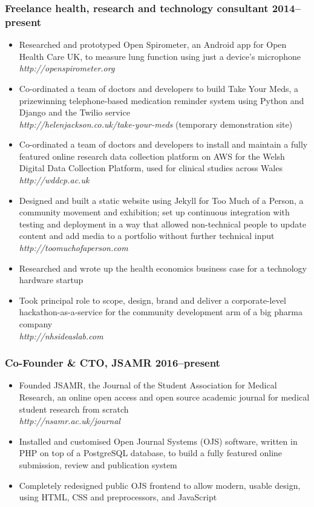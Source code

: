 \documentclass[a4paper, oneside, final, 11pt]{scrartcl} %
\begin{document}
\subsubsection*{Freelance health, research and technology consultant \hfill 2014--present}  
\normalfont
\begin{itemize}
	\item Researched and prototyped Open Spirometer, an Android app for Open Health Care UK, to measure lung function using just a device's microphone\\
	\textit{http://openspirometer.org}
	\item Co-ordinated a team of doctors and developers to build Take Your Meds, a prizewinning telephone-based medication reminder system using Python and Django and the Twilio service\\
	\textit{http://helenjackson.co.uk/take-your-meds} (temporary demonstration site)
	\item Co-ordinated a team of doctors and developers to install and maintain a fully featured online research data collection platform on AWS for the Welsh Digital Data Collection Platform, used for clinical studies across Wales\\
	\textit{http://wddcp.ac.uk}
	\item Designed and built a static website using Jekyll for Too Much of a Person, a community movement and exhibition; set up continuous integration with testing and deployment in a way that allowed non-technical people to update content and add media to a portfolio without further technical input\\
	\textit{http://toomuchofaperson.com}
	\item Researched and wrote up the health economics business case for a technology hardware startup
	\item Took principal role to scope, design, brand and deliver a corporate-level hackathon-as-a-service for the community development arm of a big pharma company\\
	\textit{http://nhsideaslab.com}
\end{itemize}

\smallskip 

\subsubsection*{Co-Founder \& CTO, JSAMR \hfill 2016--present} 
\normalfont
\begin{itemize}
	\item Founded JSAMR, the Journal of the Student Association for Medical Research, an online open access and open source academic journal for medical student research from scratch \\
	\textit{http://nsamr.ac.uk/journal}
	\item Installed and customised Open Journal Systems (OJS) software, written in PHP on top of a PostgreSQL database, to build a fully featured online submission, review and publication system
	\item Completely redesigned public OJS frontend to allow modern, usable design, using HTML, CSS and preprocessors, and JavaScript
\end{itemize}
\end{document}
